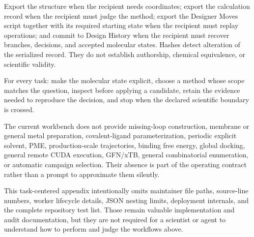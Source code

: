 \documentclass[11pt]{article}
\begin{document}
Export the structure when the recipient needs coordinates; export the calculation record when the recipient must judge the method; export the Designer Moves script together with its required starting state when the recipient must replay operations; and commit to Design History when the recipient must recover branches, decisions, and accepted molecular states. Hashes detect alteration of the serialized record. They do not establish authorship, chemical equivalence, or scientific validity.

For every task: make the molecular state explicit, choose a method whose scope matches the question, inspect before applying a candidate, retain the evidence needed to reproduce the decision, and stop when the declared scientific boundary is crossed.


The current workbench does not provide missing-loop construction, membrane or general metal preparation, covalent-ligand parameterization, periodic explicit solvent, PME, production-scale trajectories, binding free energy, global docking, general remote CUDA execution, GFN/xTB, general combinatorial enumeration, or automatic campaign selection. Their absence is part of the operating contract rather than a prompt to approximate them silently.

{\footnotesize
This task-centered appendix intentionally omits maintainer file paths, source-line numbers, worker lifecycle details, JSON nesting limits, deployment internals, and the complete repository test list. Those remain valuable implementation and audit documentation, but they are not required for a scientist or agent to understand how to perform and judge the workflows above.\par}
\endgroup


\clearpage
\end{document}
